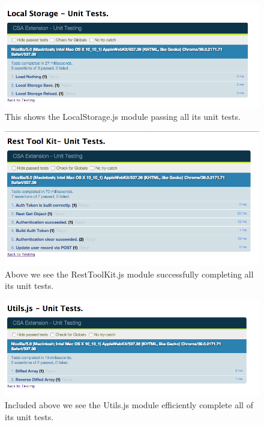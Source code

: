\documentclass{article}
\begin{document}
\begin{figure}[H]
\centering
\includegraphics[width=\textwidth]{lsqunit}
\caption{This shows the LocalStorage.js module passing all its unit tests.}
\end{figure}

\begin{figure}[H]
\centering
\includegraphics[width=\textwidth]{restqunit}
\caption{Above we see the RestToolKit.js module successfully completing all its unit tests.}
\end{figure}

\begin{figure}[H]
\centering
\includegraphics[width=\textwidth]{utilsqunit}
\caption{Included above we see the Utils.js module efficiently complete all of its unit tests.}
\end{figure}
\end{document}
